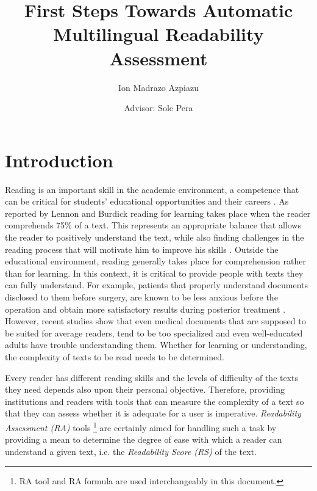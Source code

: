 \documentclass[12pt]{article}
\title{First Steps Towards Automatic Multilingual Readability Assessment}
\author{Ion Madrazo Azpiazu}
\date{Advisor: Sole Pera}
\begin{document}
\maketitle
\thispagestyle{empty}
\newpage


\tableofcontents
\thispagestyle{empty}
 \newpage

\section{Introduction}

Reading is an important skill in the academic environment, a competence that can be critical for students' educational opportunities and their careers \cite{robinson2000issues}. As reported by Lennon and Burdick \cite{lennon2004lexile}  reading for learning takes place when the reader comprehends  75\% of a text. This represents an appropriate balance that allows the reader to positively understand the text, while also finding challenges in the reading process that will motivate  him to improve his skills \cite{lennon2004lexile}. Outside the educational environment, reading generally takes place for comprehension rather than for learning. In this context, it is critical to provide people with texts they can fully understand. For example, patients 
that properly understand documents disclosed to them before surgery, are known to be less anxious before the operation and obtain more satisfactory results during posterior treatment \cite{medicalReadability2}. However, recent studies\cite{medicalReadability1,medicalReadability2,medicalReadability3}  show that even medical documents that are supposed to be suited for average readers, tend to be too specialized and even well-educated adults have trouble understanding them.
Whether for learning or understanding, the complexity of texts to be read needs to be determined.


Every reader has different reading skills and the levels of difficulty of the texts they need depends also upon their personal objective. Therefore, providing institutions and readers with tools that can measure the complexity of a text so that they can assess whether it is adequate for a user is imperative. \textit{Readability Assessment (RA)} tools \footnote{RA tool and RA formula are used interchangeably in this document.}  are certainly aimed for handling such a task by providing a mean to determine the degree of ease with which a reader can understand a given text, i.e. the \textit{Readability Score (RS)} of the text.
\end{document}
